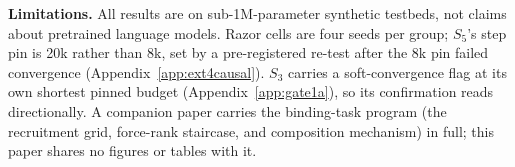 
\textbf{Limitations.} All results are on sub-1M-parameter synthetic
testbeds, not claims about pretrained language models. Razor cells are
four seeds per group; $S_5$'s step pin is 20k rather than 8k, set by a
pre-registered re-test after the 8k pin failed convergence
(Appendix~\ref{app:ext4causal}).
$S_3$ carries a soft-convergence flag at its own shortest pinned budget
(Appendix~\ref{app:gate1a}), so its confirmation reads directionally.
A companion paper \citep{larson2026companion}
carries the binding-task program (the recruitment grid, force-rank
staircase, and composition mechanism) in full; this paper shares no
figures or tables with it.
